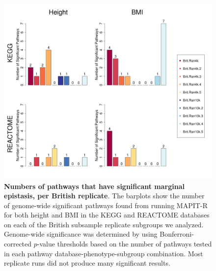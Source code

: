 \documentclass[10pt,a4paper]{article}
\begin{document}
\clearpage
\setlength{\footskip}{1cm}

\begin{figure}[htbp]
\centering
\hspace*{-1.75cm}
\includegraphics[scale=.45]{Images/Supp/InterPath_Supp_Figure_BritReps_Barplot_vs4.png}
\caption[TBD]{\textbf{Numbers of pathways that have significant marginal epistasis, per British replicate}. The barplots show the number of genome-wide significant pathways found from running MAPIT-R for both height and BMI in the KEGG and REACTOME databases on each of the British subsample replicate subgroups we analyzed. Genome-wide significance was determined by using Bonferroni-corrected $p$-value thresholds based on the number of pathways tested in each pathway database-phenotype-subgroup combination. Most replicate runs did not produce many significant results.}
\label{InterPath-Supp-Figure-BritReps-Barplots}
\end{figure}
\clearpage
\end{document}
